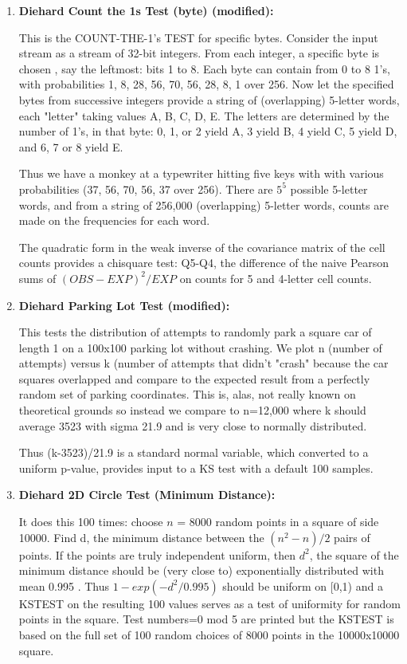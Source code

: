 \documentclass[titlepage, 11pt]{article}
\begin{document}
\begin{enumerate}
\item {\textbf{Diehard Count the 1s Test (byte) (modified):}}


This is the COUNT-THE-1's TEST for specific bytes.        
Consider the input stream as a stream of 32-bit integers. From each integer, a specific byte is chosen , say the leftmost:  bits 1 to 8. Each byte can contain from 0 to 8 1's, with probabilities 1, 8, 28, 56, 70, 56, 28, 8, 1 over 256.  Now let the specified bytes from successive integers provide a string of (overlapping) 5-letter words, each "letter" taking values A, B, C, D, E. The letters are determined  by the number of 1's, in that byte:  0, 1, or 2 yield A, 3 yield B, 4 yield C, 5 yield D, and 6, 7 or 8 yield E. 


Thus we have a monkey at a typewriter hitting five keys with with various probabilities (37, 56, 70, 56, 37 over 256). There are $5^5$ possible 5-letter words, and from a string of 256,000 (overlapping) 5-letter words, counts are made on the frequencies for each word. 


The quadratic form in the weak inverse of the covariance matrix of the cell counts provides a chisquare test:  Q5-Q4, the difference of the naive Pearson  sums of $(OBS-EXP)^2/EXP$ on counts for 5 and 4-letter cell counts. 


\item {\textbf{Diehard Parking Lot Test (modified):}}


This tests the distribution of attempts to randomly park a square car of length 1 on a 100x100 parking lot without crashing.  We plot n (number of attempts) versus k (number of attempts that didn't "crash" because the car squares overlapped and compare to the expected result from a perfectly random set of parking coordinates.  This is, alas, not really known on theoretical grounds so instead we compare to n=12,000 where k should average 3523 with sigma 21.9 and is very close to normally distributed.  


Thus (k-3523)/21.9 is a standard normal variable, which converted to a uniform p-value, provides input to a KS test with a default 100 samples.


\item {\textbf{Diehard 2D Circle Test (Minimum Distance):}}


It does this 100 times:   choose $n$ = 8000 random points in a   
square of side 10000.  Find d, the minimum distance between   
the $(n^2-n)/2$ pairs of points.  If the points are truly independent uniform, then $d^2$, the square of the minimum distance 
should be (very close to) exponentially distributed with mean 
0.995 .  Thus $1-exp(-d^2/0.995)$ should be uniform on [0,1) and  
a KSTEST on the resulting 100 values serves as a test of uniformity for random points in the square. Test numbers=0 mod 5 
are printed but the KSTEST is based on the full set of 100    
random choices of 8000 points in the 10000x10000 square.      



\end{enumerate}
\end{document}
